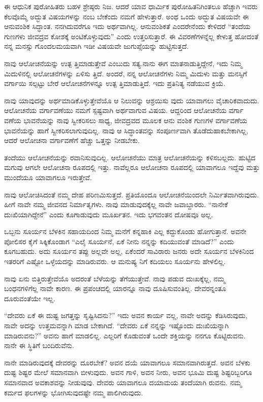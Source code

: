 ಈ ಆಧುನಿಕ ಪುರೋಹಿತರು ಬಹಳ ಶ್ರೇಷ್ಠರು ನಿಜ. ಆದರೆ ಯಾವ ಧಾರ್ಮಿಕ ಪುರೋಹಿತನಿಗಿಂತಲೂ ಹೆಚ್ಚಾಗಿ ಇವರು ಕೆಲವೊಮ್ಮೆ ಅದ್ಭುತ ವಿಷಯಗಳನ್ನು ನಂಬ ಬೇಕೆಂದು ನಮಗೆ ಹೇಳುತ್ತಾರೆ. ಅಂಥ ಒಂದು ಅದ್ಭುತ ವಿಷಯವೇ ಈ ಆನುವಂಶಿಕ ಸಿದ್ಧಾಂತ. ನನಗಿದುವರೆಗೂ ಇದು ಅರ್ಥವಾಗಿಲ್ಲ. ಆನುವಂಶಿಕತೆ ಎಂದರೇನೆಂದು ಕೇಳಿದರೆ “ತಂದೆಯ ಗುಣಗಳು ಜೀವದ್ರವ ಕೋಶಕ್ಕೆ ಅಂಟಿಕೊಳ್ಳುವುದು” ಎಂದು ಉತ್ತರಿಸುತ್ತಾರೆ. ಈ ವಿವರಣೆಗಳನ್ನೆಲ್ಲ ಕೇಳುತ್ತ ಹೋದಂತೆ ನನ್ನ ಮನಸ್ಸು ಗೊಂದಲಮಯವಾಗಿ ಇಡೀ ವಿಷಯವೇ ಜುಗುಪ್ಸೆಯನ್ನು ಹುಟ್ಟಿಸುತ್ತದೆ.

ನಾವು ಆಲೋಚನೆಯನ್ನು ಉತ್ಪ ತ್ತಿಮಾಡುತ್ತೇವೆ ಎಂಬುದು ಸತ್ಯ.ನಾನು ಈಗ ಮಾತನಾಡುತ್ತಿದ್ದೇನೆ, ಇದು ನಿಮ್ಮ ಮಿದುಳಿನಲ್ಲಿ ಆಲೋಚನೆಗಳನ್ನು ಏಳಿಸು ತ್ತಿದೆ. ಅಂದರೆ, ನನ್ನ ಆಲೋಚನೆಗಳು ನಿಮ್ಮ ಮಿದುಳು ಮತ್ತು ಮನಸ್ಸಿಗೆ ವರ್ಗಾಯಿ ಸಲ್ಪಟ್ಟು ಬೇರೆ ಆಲೋಚನೆಗಳನ್ನೂ ಉತ್ಪ ತ್ತಿಮಾಡುತ್ತಿದೆ. ಇದು ಪ್ರತಿನಿತ್ಯ ನಡೆಯುವ ಕ್ರಿಯೆ.

ನಾವು ಯಾವುದನ್ನು ಅರ್ಥಮಾಡಿಕೊಳ್ಳುತ್ತೇವೆಯೊ ಆ ನಿಲುವನ್ನು ಆಶ್ರಯಿಸು ವುದು ಯಾವಾಗಲು ವೈಚಾರಿಕವಾದುದು. ಆಲೋಚನೆಯ ವರ್ಗಾವಣೆಯು ನಮಗೆ ಸ್ಪಷ್ಟವಾಗಿ ಅರ್ಥವಾಗುವ ವಿಷಯ. ಆದ್ದರಿಂದ ಆಲೋಚನೆಯ ವರ್ಗಾ ವಣೆಯ ಭಾವನೆಯನ್ನು ನಾವು ಸ್ವೀಕರಿಸಲು ಸಾಧ್ಯ, ಜೀವದ್ರವದ ಮೂಲಕ ಆನು ವಂಶಿಕ ಗುಣಗಳ ವರ್ಗಾವಣೆಯ ಭಾವನೆಯನ್ನು ಹಾಗೆ ಸ್ವೀಕರಿಸಲಾಗುವುದಿಲ್ಲ. ನಾವು ಆ ಸಿದ್ಧಾಂತವನ್ನು ಸಂಪೂರ್ಣವಾಗಿ ತೊಡೆದುಹಾಕಬೇಕಾಗಿಲ್ಲ, ಆದರೆ ಆಲೋಚನಾ ವರ್ಗಾವಣೆಗೆ ಹೆಚ್ಚು ಒತ್ತನ್ನು ನೀಡಬೇಕು.

ತಂದೆಯು ಆಲೋಚನೆಯನ್ನು ರವಾನಿಸುವುದಿಲ್ಲ. ಆಲೋಚನೆಯು ಮಾತ್ರ ಆಲೋಚನೆಯನ್ನು ಕಳಿಸಬಲ್ಲದು. ಹುಟ್ಟಿದ ಮಗುವು ಆಗಲೇ ಆಲೋಚನಾ ರೂಪದಲ್ಲಿ ಇತ್ತು. ನಾವೆಲ್ಲರೂ ಆಲೋಚನಾ ರೂಪದಲ್ಲಿ ಯಾವಾಗಲೂ ಇದ್ದೆವು ಮತ್ತು ಮುಂದೆಯೂ ಯಾವಾಗಲೂ ಇರುತ್ತೇವೆ.

ನಾವು ಆಲೋಚಿಸಿದಂತೆ ನಮ್ಮ ದೇಹ ಪರಿಣಮಿಸುತ್ತದೆ. ಪ್ರತಿಯೊಂದೂ ಆಲೋಚನೆಯಿಂದಲೇ ನಿರ್ಮಿತವಾಗಿರುವುದು. ಹೀಗೆ ನಾವೇ ನಮ್ಮ ಜೀವನದ ನಿರ್ಮಾತೃಗಳು. ನಾವು ಮಾಡುವುದಕ್ಕೆಲ್ಲ ನಾವೇ ಜವಾಬ್ದಾರರು. “ನಾನೇಕೆ ದುಃಖಿಯಾಗಿದ್ದೇನೆ” ಎಂದು ಕೂಗಾಡುವುದು ಮೂರ್ಖತನ. ಇದು ಭಗವಂತನ ದೋಷವೂ ಅಲ್ಲ.

ಒಬ್ಬನು ಸೂರ್ಯನ ಬೆಳಕಿನ ಸಹಾಯದಿಂದ ನಿಮ್ಮ ಮನೆಗೆ ಕನ್ನಹಾಕಿ ಎಲ್ಲ ಕದ್ದುಕೊಂಡು ಹೋಗುತ್ತಾನೆ. ಅವನೇ ಪೋಲಿಸರ ಕೈಗೆ ಸಿಕ್ಕಿಕೊಂಡಾಗ “ಎಲೈ ಸೂರ್ಯನೆ, ಏಕೆ ನೀನು ನನ್ನನ್ನು ಕದಿಯುವಂತೆ ಮಾಡಿದೆ?” ಎಂದು ಕೂಗಬಹುದು. ಅದು ಸೂರ್ಯನ ತಪ್ಪು ಅಲ್ಲವೇ ಅಲ್ಲ, ಏಕೆಂದರೆ ಸಾವಿರಾರು ಜನರು ಅದೇ ಸೂರ್ಯನ ಬೆಳಕಿನಿಂದ ಇತರರಿಗೆ ಎಷ್ಟೋ ಒಳ್ಳೆಯದನ್ನು ಮಾಡಿರುವರು. ಆ ಮನುಷ್ಯ ನಿಗೆ ಕದಿಯಲು ಸೂರ್ಯನು ಹೇಳಲಿಲ್ಲ.

ನಾವು ಏನು ಬಿತ್ತಿರುತ್ತೇವೆಯೊ ಅದರಂತೆ ಬೆಳೆಯನ್ನು ತೆಗೆಯುತ್ತೇವೆ. ನಾವು ಪಡುವ ದುಃಖಕ್ಕೆಲ್ಲ, ನಮ್ಮ ಬಂಧನಗಳಿಗೆಲ್ಲ ನಾವೇ ಕಾರಣ. ಈ ಪ್ರಪಂಚದಲ್ಲಿ ಯಾರನ್ನೂ ನಾವು ದೂಷಿಸುವಂತಿಲ್ಲ. ದೇವರನ್ನಂತೂ ದೂರುವಂತೆಯೇ ಇಲ್ಲ.

“ದೇವರು ಏಕೆ ಈ ದುಷ್ಟ ಜಗತ್ತನ್ನು ಸೃಷ್ಟಿಸಿದನು?” ಇದು ಅವನ ಕಾರ್ಯ ವಲ್ಲ, ನಾವೇ ಅದನ್ನು ಕೆಡಿಸಿರುವುದು, ನಾವೇ ಅದನ್ನು ಉತ್ತಮವನ್ನಾಗಿ ಮಾಡ ಬೇಕಾಗಿದೆ. “ದೇವರು ಏಕೆ ನನ್ನನ್ನು ಇಷ್ಟೊಂದು ದುಃಖಿಯನ್ನಾಗಿ ಮಾಡಿರುವನು?” ಅವನು ಹಾಗೆ ಮಾಡಲಿಲ್ಲ. ಎಲ್ಲರಿಗೆ ಕೊಡುವಂತೆ ಒಂದೇ ಶಕ್ತಿಯನ್ನು ನನಗೂ ಕೊಟ್ಟಿರುವನು. ನಾನೇ ಈ ಸ್ಥಿತಿಗೆ ಬಂದಿರುವೆನು.

ನಾನೇ ಮಾಡಿರುವುದಕ್ಕೆ ದೇವರನ್ನು ದೂರಬೇಕೆ? ಅವನ ದಯೆ ಯಾವಾಗಲೂ ಸಮಾನವಾಗಿರುತ್ತದೆ. ಅವನ ಬೆಳಕು ದುಷ್ಟ ಶಿಷ್ಟರ ಮೇಲೆ ಸಮಾನವಾಗಿ ಬೀಳುವುದು. ಅವನ ಗಾಳಿ, ಅವನ ನೀರು, ಅವನ ಭೂಮಿ ದುಷ್ಟ ಶಿಷ್ಟರಿಬ್ಬರಿಗೂ ಸಮಾನವಾದ ಅವಕಾಶವನ್ನು ನೀಡುವುವು. ದೇವರು ಯಾವಾಗಲೂ ದಯಾಮಯ ತಂದೆಯಾಗಿ ರುವನು. ನಮ್ಮ ಕರ್ಮದ ಫಲಗಳನ್ನು ಭೋಗಿಸುವುದಷ್ಟೇ ನಮ್ಮ ಪಾಲಿಗಿರುವುದು.

